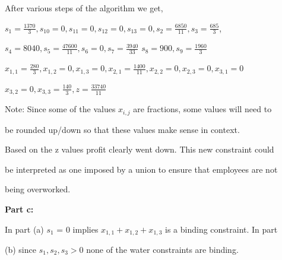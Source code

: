 \documentclass{article}
\begin{document}
After various steps of the algorithm we get, 

\vspace{\baselineskip}

$s_1 = \frac{1370}{3}, s_{10} = 0, s_{11} = 0, s_{12} = 0, s_{13} = 0, s_2 = \frac{6850}{11}, s_3 = \frac{685}{3}$,

$ s_4 = 8040, s_5 = \frac{47600}{11}, s_6 = 0, s_7 = \frac{3940}{33}$ $s_8 = 900, s_9 = \frac{1960}{3}$

$x_{1,1} = \frac{280}{3}, x_{1,2} = 0, x_{1,3} = 0, x_{2,1} = \frac{1400}{11}, x_{2,2} = 0, x_{2,3} = 0, x_{3,1} = 0
$

$
x_{3,2} = 0, x_{3,3} = \frac{140}{3}, z = \frac{33740}{11}
$

\vspace{\baselineskip}

Note: Since some of the values $x_{i,j}$ are fractions, some values will need to 

be rounded up/down so that these values make sense in context.

\vspace{\baselineskip}

Based on the z values profit clearly went down. This new constraint could 

be interpreted as one imposed by a union to ensure that employees are not 

being overworked.

\vspace{\baselineskip}

\newpage

\textbf{Part c:}

In part (a) $s_1$ = 0 implies $x_{1,1} + x_{1,2} + x_{1,3}$ is a binding constraint. In part 

(b) since $s_{1} , s_{2}, s_{3} > 0$ none of the water constraints are binding.

\begin{table}[h]
    \centering
    \caption{Profit (z) given increase in turnout conditions}
    \label{tab:turnout_conditions}
\end{table}
\end{document}
